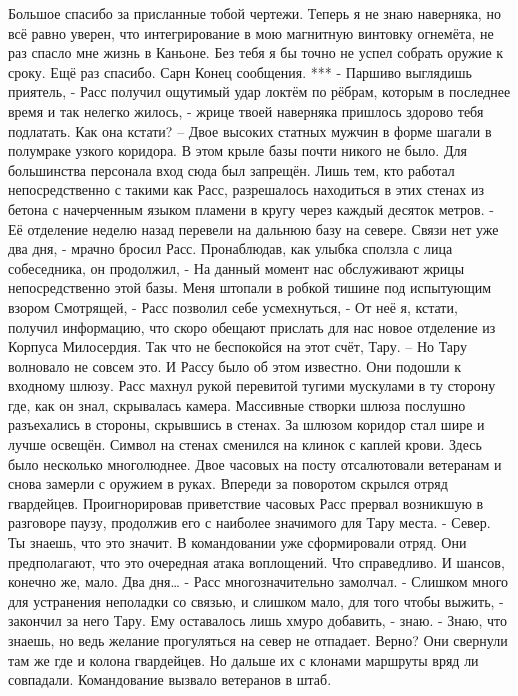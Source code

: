 \documentclass[a4paper, 12pt]{report}
\begin{document}
Большое спасибо за присланные тобой чертежи. Теперь я не знаю наверняка, но всё равно уверен, что интегрирование в мою магнитную винтовку огнемёта, не раз спасло мне жизнь в Каньоне. Без тебя я бы точно не успел собрать оружие к сроку. Ещё раз спасибо.
Сарн
Конец сообщения. 
***
	- Паршиво выглядишь приятель, - Расс получил ощутимый удар локтём по рёбрам, которым в последнее время и так нелегко жилось, - жрице твоей наверняка пришлось здорово тебя подлатать. Как она кстати? –
	Двое высоких статных мужчин в форме шагали в полумраке узкого коридора. В этом крыле базы почти никого не было. Для большинства персонала вход сюда был запрещён. Лишь тем, кто работал непосредственно с такими как Расс, разрешалось находиться в этих стенах из бетона с начерченным языком пламени в кругу через каждый десяток метров.
	- Её отделение неделю назад перевели на дальнюю базу на севере. Связи нет уже два дня, - мрачно бросил Расс. Пронаблюдав, как улыбка сползла с лица собеседника, он продолжил, - На данный момент нас обслуживают жрицы непосредственно этой базы. Меня штопали в робкой тишине под испытующим взором Смотрящей, - Расс позволил себе усмехнуться, - От неё я, кстати, получил информацию, что скоро обещают прислать для нас новое отделение из Корпуса Милосердия. Так что не беспокойся на этот счёт, Тару. –
	Но Тару волновало не совсем это. И Рассу было об этом известно. 
Они подошли к входному шлюзу. Расс махнул рукой перевитой тугими мускулами в ту сторону где, как он знал, скрывалась камера. Массивные створки шлюза послушно разъехались в стороны, скрывшись в стенах.
За шлюзом коридор стал шире и лучше освещён. Символ на стенах сменился на клинок с каплей крови. Здесь было несколько многолюднее. Двое часовых на посту отсалютовали ветеранам и снова замерли с оружием в руках. Впереди за поворотом скрылся отряд гвардейцев. Проигнорировав приветствие часовых Расс прервал возникшую в разговоре паузу, продолжив его с наиболее значимого для Тару места.
- Север. Ты знаешь, что это значит. В командовании уже сформировали отряд. Они предполагают, что это очередная атака воплощений. Что справедливо. И шансов, конечно же, мало. Два дня… - Расс многозначительно замолчал.
 - Слишком много для устранения неполадки со связью, и слишком мало, для того чтобы выжить, - закончил за него Тару. Ему оставалось лишь хмуро добавить, - знаю. 
- Знаю, что знаешь, но ведь желание прогуляться на север не отпадает. Верно?
	Они свернули там же где и колона гвардейцев. Но дальше их с клонами маршруты вряд ли совпадали. Командование вызвало ветеранов в штаб.
\end{document}
